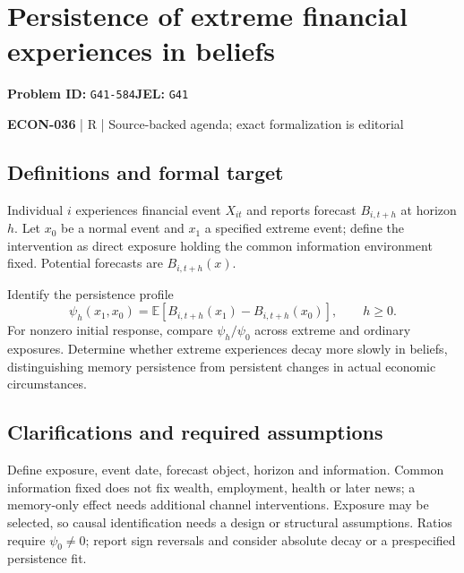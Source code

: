 \documentclass[11pt,a4paper]{article}
\begin{document}
\section*{Persistence of extreme financial experiences in beliefs}
\textbf{Problem ID:} \texttt{G41-584}\quad \textbf{JEL:} \texttt{G41}\par
\label{problem:OP-0612}


\label{audited:ECON-036}

{\sffamily\small\color{muted}\textbf{ECON-036} | R | Source-backed agenda; exact formalization is editorial\par}

\subsection*{Definitions and formal target}

Individual $i$ experiences financial event $X_{it}$ and reports forecast $B_{i,t+h}$ at horizon $h$. Let $x_0$ be a normal event and $x_1$ a specified extreme event; define the intervention as direct exposure holding the common information environment fixed. Potential forecasts are $B_{i,t+h}(x)$.

Identify the persistence profile
\[
 \psi_h(x_1,x_0)=\mathbb E[B_{i,t+h}(x_1)-B_{i,t+h}(x_0)],\qquad h\geq0.
\]
For nonzero initial response, compare $\psi_h/\psi_0$ across extreme and ordinary exposures. Determine whether extreme experiences decay more slowly in beliefs, distinguishing memory persistence from persistent changes in actual economic circumstances.

\subsection*{Clarifications and required assumptions}

Define exposure, event date, forecast object, horizon and information. Common information fixed does not fix wealth, employment, health or later news; a memory-only effect needs additional channel interventions. Exposure may be selected, so causal identification needs a design or structural assumptions. Ratios require \(\psi_0\ne0\); report sign reversals and consider absolute decay or a prespecified persistence fit.
\end{document}
